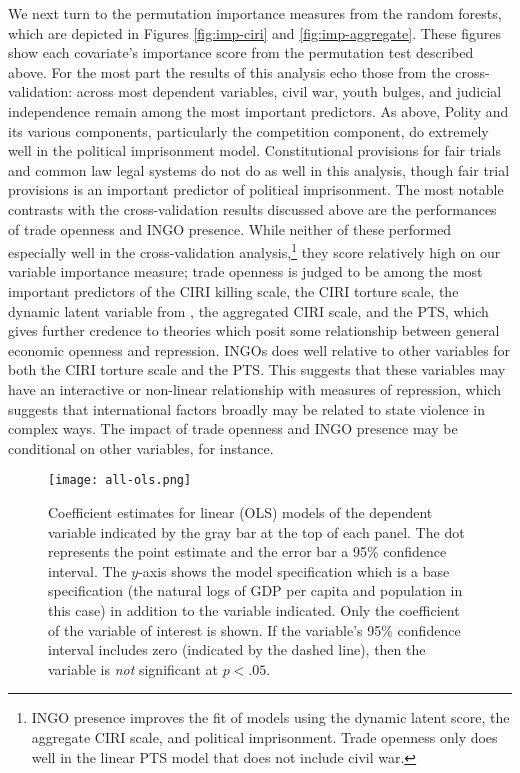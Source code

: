 \documentclass[11pt]{article}
\begin{document}
We next turn to the permutation importance measures from the random forests, which are depicted in Figures \ref{fig:imp-ciri} and \ref{fig:imp-aggregate}. These figures show each covariate's importance score from the permutation test described above. For the most part the results of this analysis echo those from the cross-validation: across most dependent variables, civil war, youth bulges, and judicial independence remain among the most important predictors. As above, Polity and its various components, particularly the competition component, do extremely well in the political imprisonment model. Constitutional provisions for fair trials and common law legal systems do not do as well in this analysis, though fair trial provisions is an important predictor of political imprisonment. The most notable contrasts with the cross-validation results discussed above are the performances of trade openness and INGO presence. While neither of these performed especially well in the cross-validation analysis,\footnote{INGO presence improves the fit of models using the dynamic latent score, the aggregate CIRI scale, and political imprisonment. Trade openness only does well in the linear PTS model that does not include civil war.} they score relatively high on our variable importance measure; trade openness is judged to be among the most important predictors of the CIRI killing scale, the CIRI torture scale, the dynamic latent variable from \citet{Fariss2013}, the aggregated CIRI scale, and the PTS, which gives further credence to theories which posit some relationship between general economic openness and repression. INGOs does well relative to other variables for both the CIRI torture scale and the PTS. This suggests that these variables may have an interactive or non-linear relationship with measures of repression, which suggests that international factors broadly may be related to state violence in complex ways. The impact of trade openness and INGO presence may be conditional on other variables, for instance. 

\begin{figure}[!htpb]
\texttt{[image: all-ols.png]}
\caption{Coefficient estimates for linear (OLS) models of the dependent variable indicated by the gray bar at the top of each panel. The dot represents the point estimate and the error bar a 95\% confidence interval. The $y$-axis shows the model specification which is a base specification (the natural logs of GDP per capita and population in this case) in addition to the variable indicated. Only the coefficient of the variable of interest is shown. If the variable's 95\% confidence interval includes zero (indicated by the dashed line), then the variable is \textit{not} significant at $p < .05$.}
\label{fig:all-ols}
\end{figure}
\end{document}
